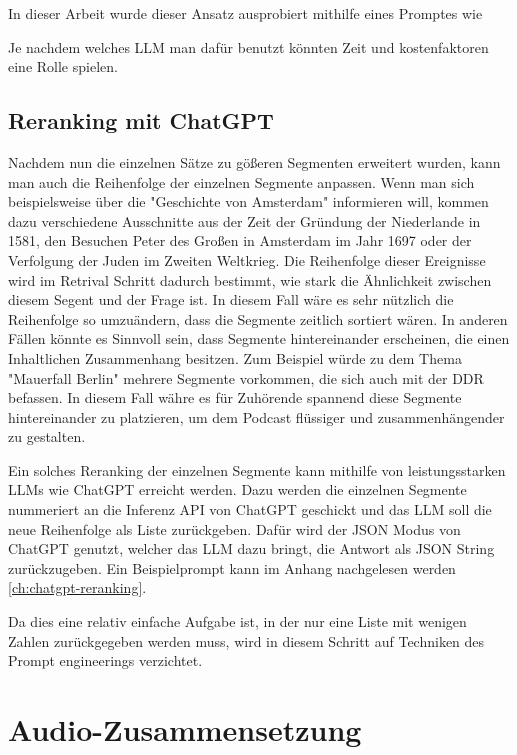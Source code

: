 In dieser Arbeit wurde dieser Ansatz ausprobiert mithilfe eines Promptes wie 

Je nachdem welches LLM man dafür benutzt könnten Zeit und kostenfaktoren eine Rolle spielen.


\subsection{Reranking mit ChatGPT}

Nachdem nun die einzelnen Sätze zu gößeren Segmenten erweitert wurden, kann man auch die Reihenfolge der einzelnen Segmente anpassen.
Wenn man sich beispielsweise über die "Geschichte von Amsterdam" informieren will, kommen dazu verschiedene Ausschnitte aus der Zeit der Gründung der Niederlande in 1581, den Besuchen Peter des Großen in Amsterdam im Jahr 1697 oder der Verfolgung der Juden im Zweiten Weltkrieg.
Die Reihenfolge dieser Ereignisse wird im Retrival Schritt dadurch bestimmt, wie stark die Ähnlichkeit zwischen diesem Segent und der Frage ist.
In diesem Fall wäre es sehr nützlich die Reihenfolge so umzuändern, dass die Segmente zeitlich sortiert wären.
In anderen Fällen könnte es Sinnvoll sein, dass Segmente hintereinander erscheinen, die einen Inhaltlichen Zusammenhang besitzen.
Zum Beispiel würde zu dem Thema "Mauerfall Berlin" mehrere Segmente vorkommen, die sich auch mit der DDR befassen.
In diesem Fall währe es für Zuhörende spannend diese Segmente hintereinander zu platzieren, um dem Podcast flüssiger und zusammenhängender zu gestalten.

Ein solches Reranking der einzelnen Segmente kann mithilfe von leistungsstarken LLMs wie ChatGPT erreicht werden.
Dazu werden die einzelnen Segmente nummeriert an die Inferenz API von ChatGPT geschickt und das LLM soll die neue Reihenfolge als Liste zurückgeben.
Dafür wird der JSON Modus von ChatGPT genutzt, welcher das LLM dazu bringt, die Antwort als JSON String zurückzugeben.
Ein Beispielprompt kann im Anhang nachgelesen werden \autoref{ch:chatgpt-reranking}.

Da dies eine relativ einfache Aufgabe ist, in der nur eine Liste mit wenigen Zahlen zurückgegeben werden muss, wird in diesem Schritt auf Techniken des Prompt engineerings verzichtet.




\section{Audio-Zusammensetzung}


